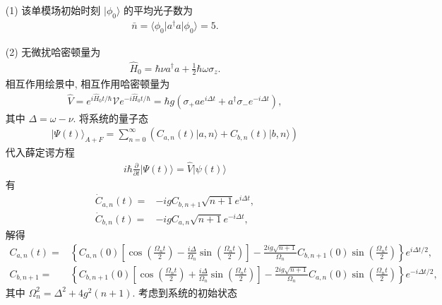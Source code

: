 \documentclass{assignment}
\begin{document}
\begin{sol}
    \begin{itemize}
        \item[(1)] 该单模场初始时刻 $\lvert\phi_0\rangle$ 的平均光子数为
        \begin{align}
            \bar{n}=\langle\phi_0\rvert a^{\dagger}a\lvert\phi_0\rangle=5.
        \end{align}
        \item[(2)] 无微扰哈密顿量为
        \begin{align}
            \hat{H}_0=\hbar\nu a^{\dagger}a+\frac{1}{2}\hbar\omega\sigma_z.
        \end{align}
        相互作用绘景中, 相互作用哈密顿量为
        \begin{align}
            \hat{V}=e^{i\hat{H}_0t/\hbar}\mathscr{V}e^{-i\hat{H}_0t/\hbar}=\hbar g(\sigma_+ae^{i\Delta t}+a^{\dagger}\sigma_-e^{-i\Delta t}),
        \end{align}
        其中 $\Delta=\omega-\nu$.
        将系统的量子态
        \begin{align}
            \lvert\Psi(t)\rangle_{A+F}=\sum_{n=0}^{\infty}(C_{a,n}(t)\lvert a,n\rangle+C_{b,n}(t)\lvert b,n\rangle)
        \end{align}
        代入薛定谔方程
        \begin{align}
            i\hbar\frac{\partial}{\partial t}\lvert\Psi(t)\rangle=\hat{V}\lvert\psi(t)\rangle
        \end{align}
        有
        \begin{align}
            \dot{C}_{a,n}(t)=&-igC_{b,n+1}\sqrt{n+1}e^{i\Delta t},\\
            \dot{C}_{b,n}(t)=&-igC_{a,n}\sqrt{n+1}e^{-i\Delta t},
        \end{align}
        解得
        \begin{align}
            C_{a,n}(t)=&\left\{C_{a,n}(0)\left[\cos\left(\frac{\Omega_nt}{2}\right)-\frac{i\Delta}{\Omega_n}\sin\left(\frac{\Omega_nt}{2}\right)\right]-\frac{2ig\sqrt{n+1}}{\Omega_n}C_{b,n+1}(0)\sin\left(\frac{\Omega_nt}{2}\right)\right\}e^{i\Delta t/2},\\
            C_{b,n+1}=&\left\{C_{b,n+1}(0)\left[\cos\left(\frac{\Omega_nt}{2}\right)+\frac{i\Delta}{\Omega_n}\sin\left(\frac{\Omega_nt}{2}\right)\right]-\frac{2ig\sqrt{n+1}}{\Omega_n}C_{a,n}(0)\sin\left(\frac{\Omega_nt}{2}\right)\right\}e^{-i\Delta t/2},
        \end{align}
        其中 $\Omega_n^2=\Delta^2+4g^2(n+1)$.
        考虑到系统的初始状态

\end{itemize}
\end{sol}
\end{document}
